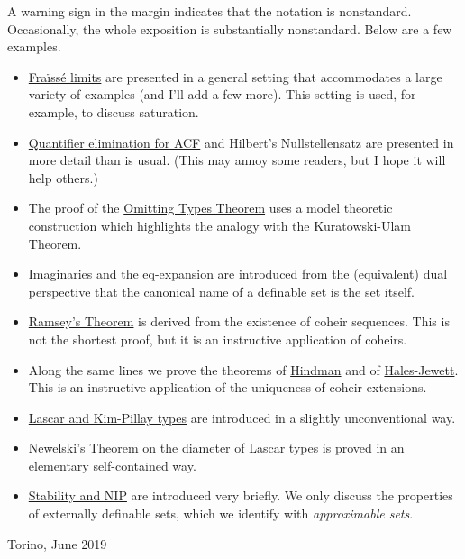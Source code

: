 \noindent\llap{\textcolor{red}{\Large\danger}\kern1.5ex}A warning sign in the margin indicates that the notation is nonstandard.
Occasionally, the whole exposition is substantially nonstandard.
Below are a few examples.

\begin{itemize}
\item \hyperref[rich]{Fraïssé limits} are presented in a general setting that accommodates a large variety of examples (and I'll add a few more).
This setting is used, for example, to discuss saturation.
\item \hyperref[algebraic]{Quantifier elimination for ACF} and Hilbert's Nullstellensatz are presented in more detail than is usual.
(This may annoy some readers, but I hope it will help others.)
\item The proof of the \hyperref[countable]{Omitting Types Theorem} uses a model theoretic construction which highlights the analogy with the Kuratowski-Ulam Theorem.
\item \hyperref[imaginary]{Imaginaries and the eq-expansion} are introduced from the (equivalent) dual perspective that the canonical name of a definable set is the set itself.
\item \hyperref[Ramsey]{Ramsey's Theorem} is derived from the existence of coheir sequences.
This is not the shortest proof, but it is an instructive application of coheirs.
\item Along the same lines we prove the theorems of \hyperref[Hindman]{Hindman} and of \hyperref[HJ]{Hales-Jewett}. This is an instructive application of the uniqueness of coheir extensions.
\item \hyperref[invariantL]{Lascar and Kim-Pillay types} are introduced in a slightly unconventional way.
\item \hyperref[newelski]{Newelski's Theorem\/} on the diameter of Lascar types is proved in an elementary self-contained way.
\item  \hyperref[external]{Stability and NIP\/} are introduced very briefly.
We only discuss the properties of externally definable sets, which we identify with \textit{approximable sets}.
\end{itemize}

\bigskip\bigskip
\hfill Torino, June 2019
